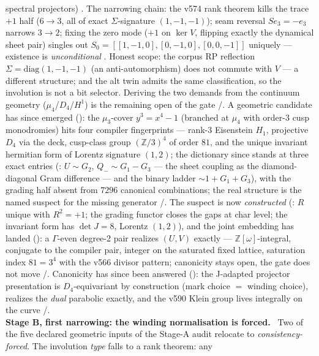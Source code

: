 \documentclass[11pt,a4paper]{article}
\theoremstyle{definition}
\begin{document}
\begin{winbox}
spectral projectors) \mE.  The narrowing chain: the v574 rank theorem
kills the trace $+1$ half ($6\to3$, all of exact $\Sigma$-signature
$(1,-1,-1)$); seam reversal $Se_3=-e_3$ narrows $3\to2$; fixing the
zero mode ($+1$ on $\ker V$, flipping exactly the dynamical sheet
pair) singles out $S_0=[[1,-1,0],[0,-1,0],[0,0,-1]]$ uniquely ---
existence is \emph{unconditional} \mE.  Honest scope: the corpus RP
reflection $\Sigma=\mathrm{diag}(1,-1,-1)$ (an anti-automorphism) does
not commute with $V$ --- a different structure; and the alt twin admits
the same classification, so the involution is not a bit selector.
Deriving the two demands from the continuum geometry
($\mu_4$/$D_4$/$H^1$) is the remaining open of the gate \mE/\mC.
A geometric candidate has since emerged
(): the $\mu_3$-cover $y^3=x^4-1$
(branched at $\mu_4$ with order-3 cusp monodromies) hits four compiler
fingerprints --- rank-3 Eisenstein $H_1$, projective $D_4$ via the
deck, cusp-class group $(\mathbb{Z}/3)^4$ of order $81$, and the
unique invariant hermitian form of Lorentz signature $(1,2)$; the
dictionary since stands at three exact entries
(: $U\sim G_2$, $Q_-\sim G_1-G_3$
--- the sheet coupling as the diamond-diagonal Gram difference ---
and the binary ladder $\sim1+G_1+G_3$), with the grading half absent
from $7296$ canonical combinations; the real structure is the named
suspect for the missing generator \mE/\mC.  The suspect is now
\emph{constructed} (: $R$ unique with
$R^2=+1$; the grading functor closes the gaps at char level; the
invariant form has $\det J=8$, Lorentz $(1,2)$), and the joint
embedding has landed (): a
$\Gamma$-even degree-2 pair realizes $(U,V)$ exactly ---
$\mathbb{Z}[\omega]$-integral, conjugate to the compiler pair,
integer on the saturated fixed lattice, saturation index $81=3^4$
with the v566 divisor pattern; canonicity stays open, the gate does
not move \mE/\mC.  Canonicity has since been answered
(): the J-adapted projector
presentation is $D_4$-equivariant by construction (mark choice $=$
winding choice), realizes the \emph{dual} parabolic exactly, and the
v590 Klein group lives integrally on the curve \mE/\mC.
\smallskip\\
\noindent\textbf{Stage B, first narrowing: the winding normalisation is forced.}
\ Two of the five declared geometric inputs of the Stage-A audit
relocate to \emph{consistency-forced}.  The involution \emph{type} falls to a rank theorem: any

\end{winbox}
\end{document}
